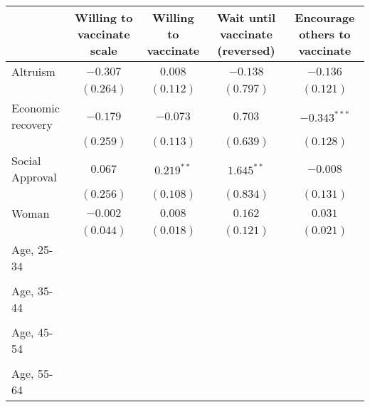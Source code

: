 \begin{table}
\begin{center}
\begin{tabular}{l c c c c}
\hline
 & Willing to vaccinate scale & Willing to vaccinate & Wait until vaccinate (reversed) & Encourage others to vaccinate \\
\hline
Altruism                                            & $-0.307$      & $0.008$       & $-0.138$      & $-0.136$       \\
                                                    & $(0.264)$     & $(0.112)$     & $(0.797)$     & $(0.121)$      \\
Economic recovery                                   & $-0.179$      & $-0.073$      & $0.703$       & $-0.343^{***}$ \\
                                                    & $(0.259)$     & $(0.113)$     & $(0.639)$     & $(0.128)$      \\
Social Approval                                     & $0.067$       & $0.219^{**}$  & $1.645^{**}$  & $-0.008$       \\
                                                    & $(0.256)$     & $(0.108)$     & $(0.834)$     & $(0.131)$      \\
Woman                                               & $-0.002$      & $0.008$       & $0.162$       & $0.031$        \\
                                                    & $(0.044)$     & $(0.018)$     & $(0.121)$     & $(0.021)$      \\
Age, 25-34                                          &               &               &               &                \\
                                                    &               &               &               &                \\
Age, 35-44                                          &               &               &               &                \\
                                                    &               &               &               &                \\
Age, 45-54                                          &               &               &               &                \\
                                                    &               &               &               &                \\
Age, 55-64                                          &               &               &               &                \\

\end{tabular}
\end{center}
\end{table}
